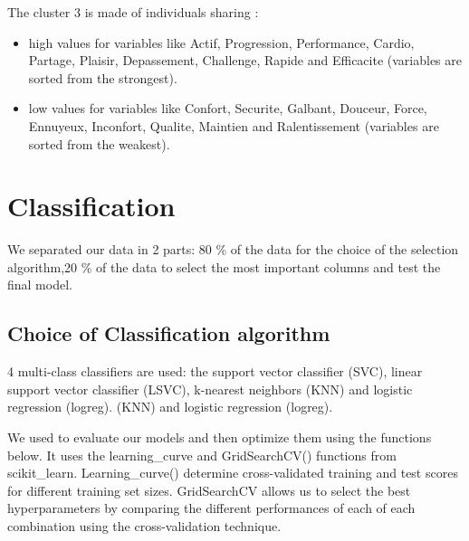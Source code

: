 \documentclass[12pt]{article}
\begin{document}
The cluster 3 is made of individuals sharing :
\begin{itemize}
    \item  high values for variables like Actif, Progression, Performance, Cardio, Partage, Plaisir, Depassement, Challenge, Rapide and Efficacite (variables are sorted from the strongest).
    
    \item  low values for variables like Confort, Securite, Galbant, Douceur, Force, Ennuyeux, Inconfort, Qualite, Maintien and Ralentissement (variables are sorted from the weakest).
\end{itemize}




\section{Classification}  %
 
 We separated our data in 2 parts: 80 \% of the data for the choice of the selection algorithm,20 \% of the data to select the most important columns and test the final model.
 
 
\subsection{Choice of Classification algorithm} 

 4 multi-class classifiers are used: the support vector classifier
(SVC), linear support vector classifier
(LSVC), k-nearest neighbors (KNN) and logistic regression (logreg). 
(KNN) and logistic regression (logreg).

\vspace{0.4 cm}
We used to evaluate our models and then optimize them using the functions below.
It uses the learning\_curve and GridSearchCV() functions from scikit\_learn. 
Learning\_curve() determine cross-validated training and test scores for different training set sizes.
GridSearchCV allows us to select the best hyperparameters by comparing the different performances of each of each combination using the cross-validation technique.
\end{document}
